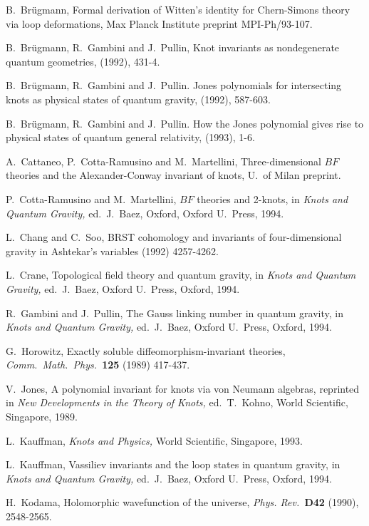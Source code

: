 \begin{thebibliography}{10}
 B.\ Br\"ugmann, Formal derivation of Witten's
identity for Chern-Simons theory via loop deformations,
Max Planck Institute preprint MPI-Ph/93-107.

 B.\ Br\"{u}gmann, R.\ Gambini and J.\ Pullin,
Knot invariants as nondegenerate quantum geometries,
 (1992), 431-4.

B.\ Br\"{u}gmann, R.\ Gambini and J.\ Pullin.
Jones polynomials for intersecting knots as physical states of quantum
gravity,  (1992), 587-603.

B.\ Br\"ugmann, R.\ Gambini and J.\ Pullin.
How the Jones polynomial gives rise to physical states of quantum
general relativity,  (1993), 1-6.

 A.\ Cattaneo, P.\ Cotta-Ramusino and M.\
Martellini, Three-dimensional $BF$ theories and the
Alexander-Conway invariant of knots, U.\ of Milan preprint.

 P.\ Cotta-Ramusino and M.\ Martellini, $BF$ theories
and 2-knots, in {\sl Knots and Quantum Gravity,} ed.\ J.\ Baez,
Oxford, Oxford U.\ Press, 1994.

L.\ Chang and C.\ Soo,
BRST cohomology and invariants of four-dimensional gravity in
Ashtekar's variables  (1992) 4257-4262.

 L.\ Crane, Topological field theory and quantum gravity,
in {\sl Knots and Quantum Gravity,} ed.\ J.\ Baez, Oxford U.\
Press, Oxford, 1994.

 R.\ Gambini and J.\ Pullin, The Gauss linking number in
quantum gravity, in {\sl Knots and Quantum Gravity,} ed.\ J.\ Baez, Oxford U.\
Press, Oxford, 1994.

\bibitem{Horowitz} G.\ Horowitz, Exactly soluble diffeomorphism-invariant
theories, {\sl Comm.\ Math.\ Phys.\ }{\bf 125} (1989) 417-437.

\bibitem{Jones} V.\ Jones, A polynomial invariant for knots via von
Neumann algebras, reprinted in {\sl New Developments in the Theory of
Knots,} ed.\ T.\ Kohno, World Scientific, Singapore, 1989.

\bibitem{Kauffman} L.\ Kauffman, {\sl Knots and Physics,}
World Scientific, Singapore, 1993.

\bibitem{Kauffman2} L.\ Kauffman, Vassiliev invariants and the loop
states in quantum gravity, in {\sl Knots and Quantum Gravity,} ed.\ J.\
Baez, Oxford U.\ Press, Oxford, 1994.

\bibitem{Kodama} H.\ Kodama, Holomorphic wavefunction of the universe,
{\sl Phys. Rev.\ }{\bf D42} (1990), 2548-2565.


\end{thebibliography}
